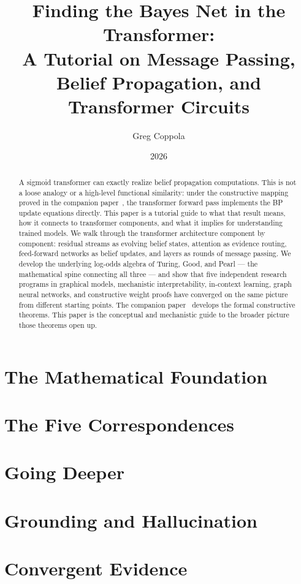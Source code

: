 \documentclass[11pt]{article}
\title{Finding the Bayes Net in the Transformer:\\
A Tutorial on Message Passing, Belief Propagation,
and Transformer Circuits}
\author{Greg Coppola}
\date{2026}
\begin{document}
\maketitle
\begin{abstract}
A sigmoid transformer can exactly realize belief propagation
computations. This is not a loose analogy or a high-level
functional similarity: under the constructive mapping proved in the
companion paper~\cite{coppola2026transformers}, the transformer
forward pass implements the BP update equations directly. This paper
is a tutorial guide to what that result means, how it connects to
transformer components, and what it implies for understanding trained
models.
We walk through the transformer architecture component by component:
residual streams as evolving belief states, attention as evidence
routing, feed-forward networks as belief updates, and layers as
rounds of message passing. We develop the underlying log-odds algebra
of Turing, Good, and Pearl --- the mathematical spine connecting all
three --- and show that five independent research programs in graphical
models, mechanistic interpretability, in-context learning, graph
neural networks, and constructive weight proofs have converged on the
same picture from different starting points.
The companion paper~\cite{coppola2026transformers} develops the formal
constructive theorems. This paper is the conceptual and mechanistic
guide to the broader picture those theorems open up.
\end{abstract}
\tableofcontents
\newpage
\part{The Mathematical Foundation}



\part{The Five Correspondences}





\part{Going Deeper}




\part{Grounding and Hallucination}

\part{Convergent Evidence}




\end{document}
